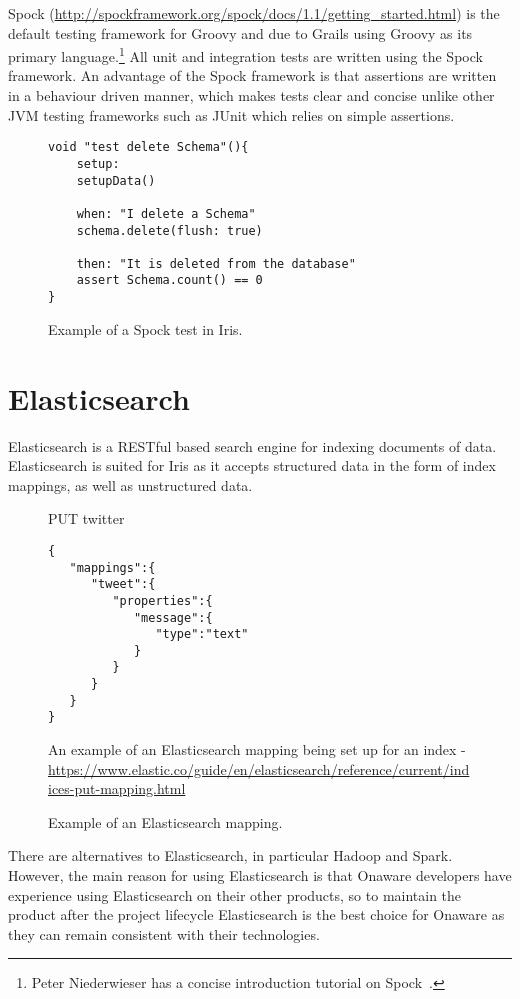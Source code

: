 \documentclass[12pt,a4paper,titlepage]{report}
\begin{document}
Spock (\url{http://spockframework.org/spock/docs/1.1/getting_started.html}) is the default testing framework for Groovy and due to Grails using Groovy as its primary language.\footnote{Peter Niederwieser has a concise introduction tutorial on Spock~\parencite{Niederwieser}.
} All unit and integration tests are written using the Spock framework. An advantage of the Spock framework is that assertions are written in a behaviour driven manner, which makes tests clear and concise unlike other JVM testing frameworks such as JUnit which relies on simple assertions.

\begin{figure}[H]
\begin{tcolorbox}
\begin{verbatim}
void "test delete Schema"(){
	setup:
	setupData()

	when: "I delete a Schema"
	schema.delete(flush: true)

	then: "It is deleted from the database"
	assert Schema.count() == 0
}
\end{verbatim}
\end{tcolorbox}
\caption{Example of a Spock test in Iris.}
\end{figure}

\section{Elasticsearch}

Elasticsearch is a RESTful based search engine for indexing documents of data. Elasticsearch is suited for Iris as it accepts structured data in the form of index mappings, as well as unstructured data. 

\begin{figure}[H]
\begin{tcolorbox}
PUT twitter
\begin{verbatim}
{
   "mappings":{
      "tweet":{
         "properties":{
            "message":{
               "type":"text"
            }
         }
      }
   }
}
\end{verbatim}
An example of an Elasticsearch mapping being set up for an index - \url{ https://www.elastic.co/guide/en/elasticsearch/reference/current/indices-put-mapping.html}
\end{tcolorbox}
\caption{Example of an Elasticsearch mapping.}
\end{figure}

There are alternatives to Elasticsearch, in particular  Hadoop and Spark. However, the main reason for using Elasticsearch is that Onaware developers have experience using Elasticsearch on their other products, so to maintain the product after the project lifecycle Elasticsearch is the best choice for Onaware as they can remain consistent with their technologies.
\end{document}
